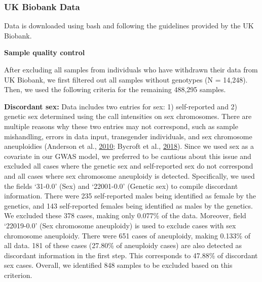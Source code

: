 \documentclass[12pt,twoside]{unicam}
\begin{document}
\hypertarget{uk-biobank-data}{%
\subsubsection{UK Biobank Data}\label{uk-biobank-data}}

Data is downloaded using bash and following the guidelines provided by the UK Biobank.

\textbf{Sample quality control}

After excluding all samples from individuals who have withdrawn their data from UK Biobank, we first filtered out all samples without genotypes (N = 14,248). Then, we used the following criteria for the remaining 488,295 samples.

\textbf{Discordant sex:} Data includes two entries for sex: 1) self-reported and 2) genetic sex determined using the call intensities on sex chromosomes. There are multiple reasons why these two entries may not correspond, such as sample mishandling, errors in data input, transgender individuals, and sex chromosome aneuploidies (Anderson et al., \protect\hyperlink{ref-Anderson2010}{2010}; Bycroft et al., \protect\hyperlink{ref-Bycroft2018}{2018}). Since we used sex as a covariate in our GWAS model, we preferred to be cautious about this issue and excluded all cases where the genetic sex and self-reported sex do not correspond and all cases where sex chromosome aneuploidy is detected. Specifically, we used the fields `31-0.0' (Sex) and `22001-0.0' (Genetic sex) to compile discordant information. There were 235 self-reported males being identified as female by the genetics, and 143 self-reported females being identified as males by the genetics. We excluded these 378 cases, making only 0.077\% of the data. Moreover, field `22019-0.0' (Sex chromosome aneuploidy) is used to exclude cases with sex chromosome aneuploidy. There were 651 cases of aneuploidy, making 0.133\% of all data. 181 of these cases (27.80\% of aneuploidy cases) are also detected as discordant information in the first step. This corresponds to 47.88\% of discordant sex cases. Overall, we identified 848 samples to be excluded based on this criterion.
\end{document}
